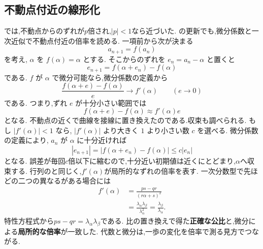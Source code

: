 \subsection{不動点付近の線形化}\label{節：非線形な更新も,不動点の近くでは線形に見える}

では,不動点からのずれが$p$倍され,$|p|<1$なら近づいた.
の更新でも,微分係数と一次近似で不動点付近の倍率を読める.
一項前から次が決まる
\[
  a_{n+1}=f(a_n)
\]
を考え,\,$\,\alpha$ を $f(\alpha)=\alpha$ とする.
そこからのずれを $e_n=a_n-\alpha$ と置くと
\[
  e_{n+1}=f(\alpha+e_n)-f(\alpha)
\]
である.
$f$ が $\alpha$ で微分可能なら,微分係数の定義から
\[
  \frac{f(\alpha+e)-f(\alpha)}{e}\longrightarrow f'(\alpha)
  \qquad(e\longrightarrow0)
\]
である.
つまり,ずれ $e$ が十分小さい範囲では
\[
  f(\alpha+e)-f(\alpha)\approx f'(\alpha)e
\]
となる.
不動点の近くで曲線を接線に置き換えたのである.収束も調べられる.
もし $|f'(\alpha)|<1$ なら,\,$\,|f'(\alpha)|$ より大きく $1$ より小さい数 $c$ を選べる.
微分係数の定義により,\,$\,a_n$ が $\alpha$ に十分近ければ
\[
  |e_{n+1}|
  =|f(\alpha+e_n)-f(\alpha)|
  \le c|e_n|
\]
となる.
誤差が毎回$c$倍以下に縮むので,十分近い初期値は近くにとどまり,$\alpha$へ収束する.
行列のと同じく,$f'(\alpha)$が局所的なずれの倍率を表す.
一次分数型で先ほどの二つの異なるがある場合には
\[
  \begin{aligned}
    f'(\alpha)
      &=\frac{ps-qr}{(r\alpha+s)^2}\\
      &=\frac{\lambda_\alpha\lambda_\beta}{\lambda_\alpha^2}
       =\frac{\lambda_\beta}{\lambda_\alpha}.
  \end{aligned}
\]
特性方程式から$ps-qr=\lambda_\alpha\lambda_\beta$である.
比の置き換えで得た\textbf{正確な公比}と,微分による\textbf{局所的な倍率}が一致した.
代数と微分は,一歩の変化を倍率で測る見方でつながる.


